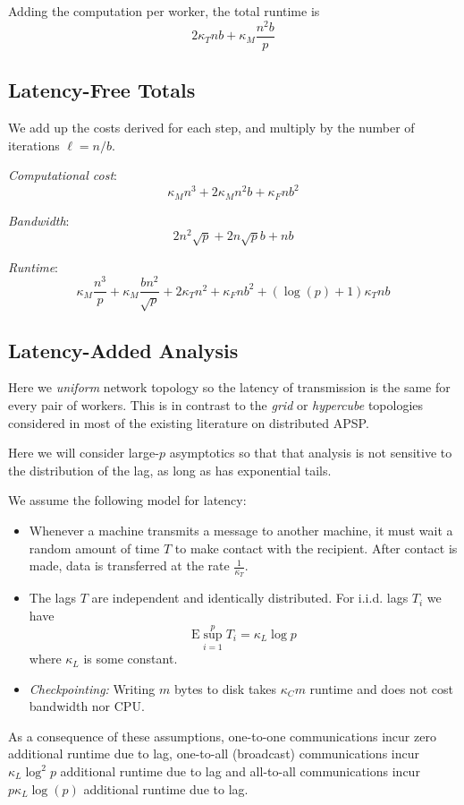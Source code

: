 \documentclass{article} %
\begin{document}
Adding the computation per worker, the total runtime is
\[
2\kappa_T nb + \kappa_M \frac{n^2b}{p}
\]

\subsection{Latency-Free Totals}

We add up the costs derived for each step, and multiply by the number of iterations $\ell = n/b$.

\emph{Computational cost}:
\[
\kappa_M n^3 + 2\kappa_M n^2 b + \kappa_F n b^2
\]

\emph{Bandwidth}:
\[
2n^2 \sqrt{p} + 2n \sqrt{p} b + nb
\]

\emph{Runtime}:
\[
\kappa_M \frac{n^3}{p} + \kappa_M \frac{bn^2}{\sqrt{p}} + 2\kappa_T n^2 + \kappa_F nb^2 + (\log(p) + 1)\kappa_T nb
\]

\subsection{Latency-Added Analysis}

Here we \emph{uniform} network topology so the latency of transmission
is the same for every pair of workers.  This is in contrast to the
\emph{grid} or \emph{hypercube} topologies considered in most of the
existing literature on distributed APSP.

Here we will consider large-$p$ asymptotics so that that analysis is
not sensitive to the distribution of the lag, as long as has
exponential tails.

We assume the following model for latency:
\begin{itemize}
\item Whenever a machine transmits a message to another machine, it
  must wait a random amount of time $T$ to make contact with the
  recipient.  After contact is made, data is transferred at the rate
  $\frac{1}{\kappa_T}$.
\item The lags $T$ are independent and identically distributed.
For i.i.d. lags $T_i$ we have
\[
\text{E} \sup_{i=1}^p T_i = \kappa_L \log p
\]
where $\kappa_L$ is some constant.
\item \emph{Checkpointing:} Writing $m$ bytes to disk takes $\kappa_C
  m$ runtime and does not cost bandwidth nor CPU.
\end{itemize}

As a consequence of these assumptions, one-to-one communications incur
zero additional runtime due to lag, one-to-all (broadcast)
communications incur $\kappa_L \log^2 p$ additional runtime due to
lag and all-to-all communications incur $p \kappa_L \log(p)$ additional
runtime due to lag.
\end{document}

